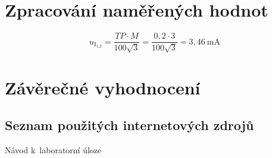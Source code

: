 \documentclass[a4paper,12pt]{article}   %
\begin{document}
\section{Zpracování naměřených hodnot}
\label{chap:zpracovani_hodnot}
\begin{equation}
  u_\text{I$_\text{1,2}$}=\frac{TP\cdot M}{100\sqrt{3}}=\frac{0,2\cdot 3}{100\sqrt{3}} = 3,46~\text{mA}
\end{equation}


\section{Závěrečné vyhodnocení}
\label{chap:zaver}



\clearpage
\renewcommand{\refname}{Seznam použité literatury a~zdrojů informací} 

\begin{thebibliography}{99}

\subsection*{Seznam použitých internetových zdrojů}
     Návod k~laboratorní úloze
    
\end{thebibliography}
\end{document}
